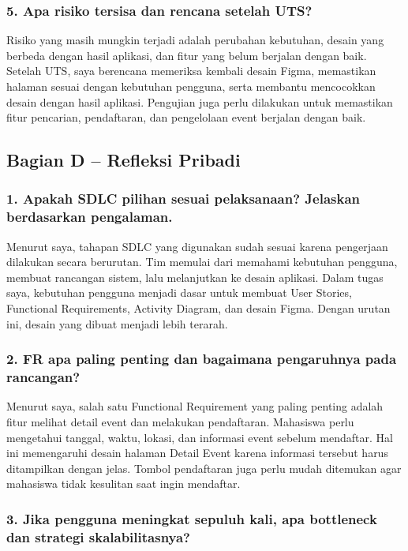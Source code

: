 \documentclass[11pt,a4paper]{article}
\begin{document}
\subsubsection*{5. Apa risiko tersisa dan rencana setelah UTS?}

Risiko yang masih mungkin terjadi adalah perubahan kebutuhan, desain yang berbeda dengan hasil aplikasi, dan fitur yang belum berjalan dengan baik. Setelah UTS, saya berencana memeriksa kembali desain Figma, memastikan halaman sesuai dengan kebutuhan pengguna, serta membantu mencocokkan desain dengan hasil aplikasi. Pengujian juga perlu dilakukan untuk memastikan fitur pencarian, pendaftaran, dan pengelolaan event berjalan dengan baik.


\subsection*{Bagian D -- Refleksi Pribadi}
\subsubsection*{1. Apakah SDLC pilihan sesuai pelaksanaan? Jelaskan berdasarkan pengalaman.}

Menurut saya, tahapan SDLC yang digunakan sudah sesuai karena pengerjaan dilakukan secara berurutan. Tim memulai dari memahami kebutuhan pengguna, membuat rancangan sistem, lalu melanjutkan ke desain aplikasi. Dalam tugas saya, kebutuhan pengguna menjadi dasar untuk membuat User Stories, Functional Requirements, Activity Diagram, dan desain Figma. Dengan urutan ini, desain yang dibuat menjadi lebih terarah.



\subsubsection*{2. FR apa paling penting dan bagaimana pengaruhnya pada rancangan?}

Menurut saya, salah satu Functional Requirement yang paling penting adalah fitur melihat detail event dan melakukan pendaftaran. Mahasiswa perlu mengetahui tanggal, waktu, lokasi, dan informasi event sebelum mendaftar. Hal ini memengaruhi desain halaman Detail Event karena informasi tersebut harus ditampilkan dengan jelas. Tombol pendaftaran juga perlu mudah ditemukan agar mahasiswa tidak kesulitan saat ingin mendaftar.



\subsubsection*{3. Jika pengguna meningkat sepuluh kali, apa bottleneck dan strategi skalabilitasnya?}
\end{document}
